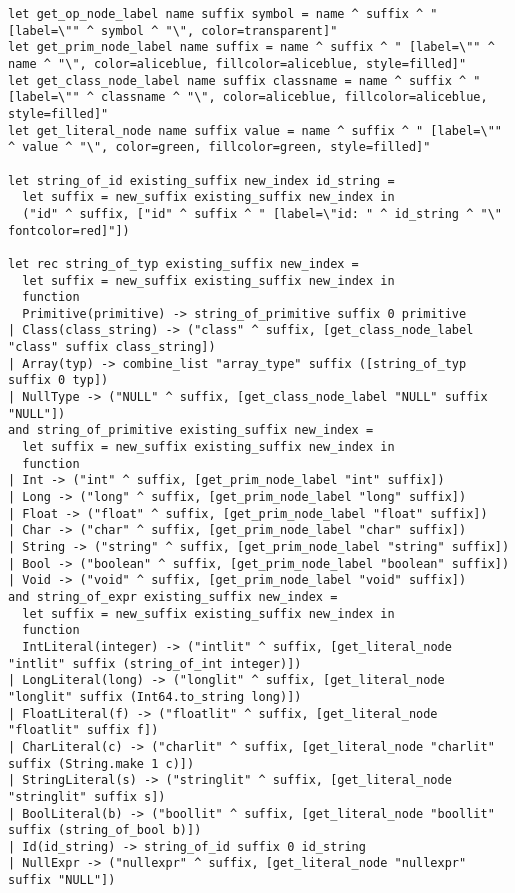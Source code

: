 \documentclass{article}
\begin{document}
\begin{verbatim}
let get_op_node_label name suffix symbol = name ^ suffix ^ " [label=\"" ^ symbol ^ "\", color=transparent]"
let get_prim_node_label name suffix = name ^ suffix ^ " [label=\"" ^ name ^ "\", color=aliceblue, fillcolor=aliceblue, style=filled]"
let get_class_node_label name suffix classname = name ^ suffix ^ " [label=\"" ^ classname ^ "\", color=aliceblue, fillcolor=aliceblue, style=filled]"
let get_literal_node name suffix value = name ^ suffix ^ " [label=\"" ^ value ^ "\", color=green, fillcolor=green, style=filled]"

let string_of_id existing_suffix new_index id_string =
  let suffix = new_suffix existing_suffix new_index in
  ("id" ^ suffix, ["id" ^ suffix ^ " [label=\"id: " ^ id_string ^ "\" fontcolor=red]"])

let rec string_of_typ existing_suffix new_index =
  let suffix = new_suffix existing_suffix new_index in
  function
  Primitive(primitive) -> string_of_primitive suffix 0 primitive
| Class(class_string) -> ("class" ^ suffix, [get_class_node_label "class" suffix class_string])
| Array(typ) -> combine_list "array_type" suffix ([string_of_typ suffix 0 typ])
| NullType -> ("NULL" ^ suffix, [get_class_node_label "NULL" suffix "NULL"])
and string_of_primitive existing_suffix new_index =
  let suffix = new_suffix existing_suffix new_index in
  function
| Int -> ("int" ^ suffix, [get_prim_node_label "int" suffix])
| Long -> ("long" ^ suffix, [get_prim_node_label "long" suffix])
| Float -> ("float" ^ suffix, [get_prim_node_label "float" suffix])
| Char -> ("char" ^ suffix, [get_prim_node_label "char" suffix])
| String -> ("string" ^ suffix, [get_prim_node_label "string" suffix])
| Bool -> ("boolean" ^ suffix, [get_prim_node_label "boolean" suffix])
| Void -> ("void" ^ suffix, [get_prim_node_label "void" suffix])
and string_of_expr existing_suffix new_index =
  let suffix = new_suffix existing_suffix new_index in
  function
  IntLiteral(integer) -> ("intlit" ^ suffix, [get_literal_node "intlit" suffix (string_of_int integer)])
| LongLiteral(long) -> ("longlit" ^ suffix, [get_literal_node "longlit" suffix (Int64.to_string long)])
| FloatLiteral(f) -> ("floatlit" ^ suffix, [get_literal_node "floatlit" suffix f])
| CharLiteral(c) -> ("charlit" ^ suffix, [get_literal_node "charlit" suffix (String.make 1 c)])
| StringLiteral(s) -> ("stringlit" ^ suffix, [get_literal_node "stringlit" suffix s])
| BoolLiteral(b) -> ("boollit" ^ suffix, [get_literal_node "boollit" suffix (string_of_bool b)])
| Id(id_string) -> string_of_id suffix 0 id_string
| NullExpr -> ("nullexpr" ^ suffix, [get_literal_node "nullexpr" suffix "NULL"])

\end{verbatim}
\end{document}
